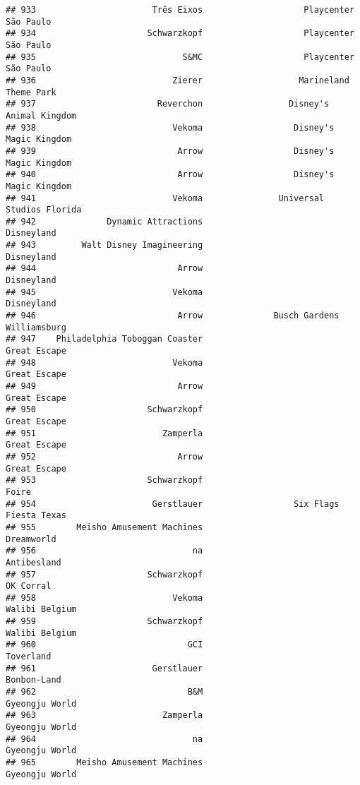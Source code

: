 \documentclass[
]{article}
\begin{document}
\begin{verbatim}
## 933                       Três Eixos                    Playcenter São Paulo
## 934                      Schwarzkopf                    Playcenter São Paulo
## 935                             S&MC                    Playcenter São Paulo
## 936                           Zierer                   Marineland Theme Park
## 937                        Reverchon                 Disney's Animal Kingdom
## 938                           Vekoma                  Disney's Magic Kingdom
## 939                            Arrow                  Disney's Magic Kingdom
## 940                            Arrow                  Disney's Magic Kingdom
## 941                           Vekoma               Universal Studios Florida
## 942              Dynamic Attractions                              Disneyland
## 943         Walt Disney Imagineering                              Disneyland
## 944                            Arrow                              Disneyland
## 945                           Vekoma                              Disneyland
## 946                            Arrow              Busch Gardens Williamsburg
## 947    Philadelphia Toboggan Coaster                            Great Escape
## 948                           Vekoma                            Great Escape
## 949                            Arrow                            Great Escape
## 950                      Schwarzkopf                            Great Escape
## 951                         Zamperla                            Great Escape
## 952                            Arrow                            Great Escape
## 953                      Schwarzkopf                                   Foire
## 954                       Gerstlauer                  Six Flags Fiesta Texas
## 955        Meisho Amusement Machines                              Dreamworld
## 956                               na                             Antibesland
## 957                      Schwarzkopf                               OK Corral
## 958                           Vekoma                          Walibi Belgium
## 959                      Schwarzkopf                          Walibi Belgium
## 960                              GCI                               Toverland
## 961                       Gerstlauer                             Bonbon-Land
## 962                              B&M                          Gyeongju World
## 963                         Zamperla                          Gyeongju World
## 964                               na                          Gyeongju World
## 965        Meisho Amusement Machines                          Gyeongju World

\end{verbatim}
\end{document}
